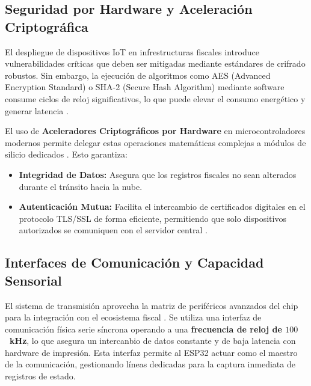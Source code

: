 \subsection{Seguridad por Hardware y Aceleración Criptográfica}

\par El despliegue de dispositivos IoT en infrestructuras fiscales introduce vulnerabilidades críticas que deben ser mitigadas mediante estándares de crifrado robustos. Sin embargo, la ejecución de algoritmos como AES (Advanced Encryption Standard) o SHA-2 (Secure Hash Algorithm) mediante software consume ciclos de reloj significativos, lo que puede elevar el consumo energético y generar latencia \cite{Espressif_ESP32_Datasheet}.\\

\par El uso de \textbf{Aceleradores Criptográficos por Hardware} en microcontroladores modernos permite delegar estas operaciones matemáticas complejas a módulos de silicio dedicados \cite{Espressif_ESP32_Datasheet, NIST_SP800_52}. Esto garantiza:

\begin{itemize}
    \item \textbf{Integridad de Datos:} Asegura que los registros fiscales no sean alterados durante el tránsito hacia la nube.
    \item \textbf{Autenticación Mutua:} Facilita el intercambio de certificados digitales en el protocolo TLS/SSL de forma eficiente, permitiendo que solo dispositivos autorizados se comuniquen con el servidor central \cite{RFC5246_TLS12}. 
\end{itemize}

\subsection{Interfaces de Comunicación y Capacidad Sensorial} 

\par El sistema de transmisión aprovecha la matriz de periféricos avanzados del chip para la integración con el ecosistema fiscal \cite{Espressif_ESP32_Datasheet}. Se utiliza una interfaz 
de comunicación física serie síncrona operando a una \textbf{frecuencia de reloj de $100$~kHz}, lo que asegura un intercanbio de datos constante y de baja latencia con hardware de impresión. Esta interfaz permite al ESP32 actuar como el maestro de la comunicación, gestionando líneas dedicadas para la captura inmediata de registros de estado.\\

